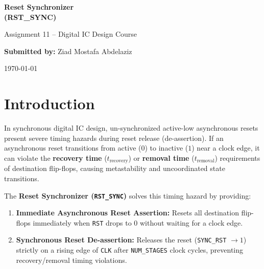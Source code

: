 \documentclass[12pt,a4paper]{article}
\begin{document}
\begin{titlepage}
\centering
\vspace*{2cm}
{\Huge\bfseries Reset Synchronizer\\(RST\_SYNC)\par}
\vspace{1cm}
{\Large Assignment 11 -- Digital IC Design Course\par}
\vspace{2cm}
{\large\textbf{Submitted by:} Ziad Mostafa Abdelaziz\par}
\vspace{0.5cm}
{\large\today\par}
\vfill
\end{titlepage}

\tableofcontents
\newpage

\section{Introduction}

In synchronous digital IC design, un-synchronized active-low asynchronous resets present severe timing hazards during reset release (de-assertion). If an asynchronous reset transitions from active ($0$) to inactive ($1$) near a clock edge, it can violate the \textbf{recovery time} ($t_{\text{recovery}}$) or \textbf{removal time} ($t_{\text{removal}}$) requirements of destination flip-flops, causing metastability and uncoordinated state transitions.

The \textbf{Reset Synchronizer (\texttt{RST\_SYNC})} solves this timing hazard by providing:
\begin{enumerate}
    \item \textbf{Immediate Asynchronous Reset Assertion:} Resets all destination flip-flops immediately when \texttt{RST} drops to $0$ without waiting for a clock edge.
    \item \textbf{Synchronous Reset De-assertion:} Releases the reset (\texttt{SYNC\_RST} $\to 1$) strictly on a rising edge of \texttt{CLK} after \texttt{NUM\_STAGES} clock cycles, preventing recovery/removal timing violations.
\end{enumerate}
\end{document}
